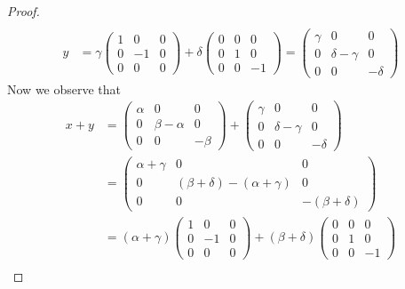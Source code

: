 \documentclass[12pt]{article}
\theoremstyle{definition}
\begin{document}
\begin{enumerate}
\begin{enumerate}[label=(\alph*)]
\begin{proof}
\begin{equation*}
\begin{split}
                                \\
                                y&=\gamma\begin{pmatrix}1&0&0\\0&-1&0\\0&0&0\end{pmatrix}+\delta
                                \begin{pmatrix}0&0&0\\0&1&0\\0&0&-1\end{pmatrix}=
                                \begin{pmatrix}\gamma&0&0\\0&\delta-\gamma&0\\0&0&-\delta\end{pmatrix}
                            \end{split}
                        \end{equation*}
                        Now we observe that 
                        \begin{equation*}
                            \begin{split}
                                x+y&=\begin{pmatrix}\alpha&0&0\\0&\beta-\alpha&0\\0&0&-\beta\end{pmatrix}
                                +\begin{pmatrix}\gamma&0&0\\0&\delta-\gamma&0\\0&0&-\delta\end{pmatrix}\\
                                &=\begin{pmatrix}\alpha+\gamma&0&0\\0&(\beta+\delta)-(\alpha+\gamma)&0\\
                                0&0&-(\beta+\delta)\end{pmatrix} \\
                                &=(\alpha+\gamma)\begin{pmatrix}1&0&0\\0&-1&0\\0&0&0\end{pmatrix}+
                                (\beta+\delta)\begin{pmatrix}0&0&0\\0&1&0\\0&0&-1\end{pmatrix}\\

\end{split}
\end{equation*}
\end{proof}
\end{enumerate}
\end{enumerate}
\end{document}

